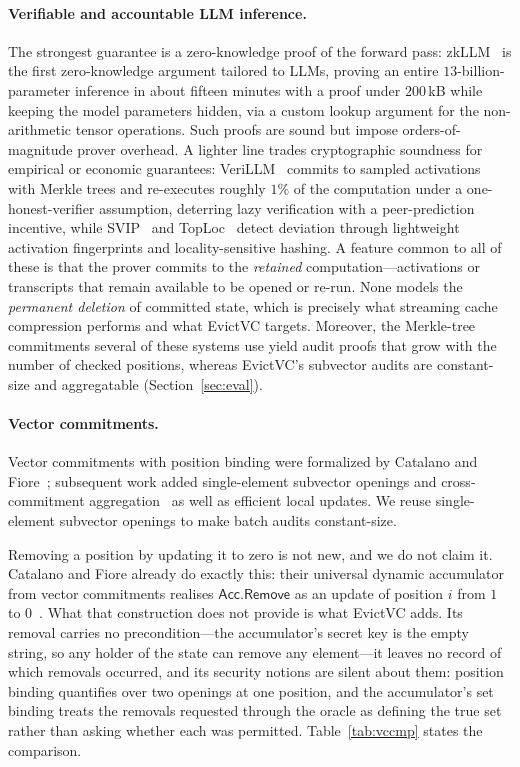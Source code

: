 \documentclass[version=preprint]{iacrcc}
\theoremstyle{definition}
\begin{document}
\paragraph{Verifiable and accountable LLM inference.}
The strongest guarantee is a zero-knowledge proof of the forward pass:
zkLLM~\cite{zkllm} is the first zero-knowledge argument tailored to LLMs, proving
an entire $13$-billion-parameter inference in about fifteen minutes with a proof
under $200$\,kB while keeping the model parameters hidden, via a custom lookup
argument for the non-arithmetic tensor operations. Such proofs are sound but
impose orders-of-magnitude prover overhead. A lighter line trades cryptographic
soundness for empirical or economic guarantees: VeriLLM~\cite{verillm} commits to
sampled activations with Merkle trees and re-executes roughly $1\%$ of the
computation under a one-honest-verifier assumption, deterring lazy verification
with a peer-prediction incentive, while SVIP~\cite{svip} and
TopLoc~\cite{toploc} detect deviation through lightweight activation fingerprints
and locality-sensitive hashing. A feature common to all of these is that the
prover commits to the \emph{retained} computation---activations or transcripts
that remain available to be opened or re-run. None models the \emph{permanent
deletion} of committed state, which is precisely what streaming cache compression
performs and what EvictVC targets. Moreover, the Merkle-tree commitments several
of these systems use yield audit proofs that grow with the number of checked
positions, whereas EvictVC's subvector audits are constant-size and aggregatable
(Section~\ref{sec:eval}).

\paragraph{Vector commitments.}
Vector commitments with position binding were formalized by Catalano and
Fiore~\cite{PKC:CatFio13}; subsequent work added single-element subvector openings and
cross-commitment aggregation~\cite{SCN:TABDFK20} as well as efficient local updates.
We reuse single-element subvector openings to make batch audits constant-size.

Removing a position by updating it to zero is not new, and we do not claim it.
Catalano and Fiore already do exactly this: their universal dynamic accumulator
from vector commitments realises $\mathsf{Acc.Remove}$ as an update of position
$i$ from $1$ to $0$~\cite[\S6.1]{PKC:CatFio13}. What that construction does not
provide is what EvictVC adds. Its removal carries no precondition---the
accumulator's secret key is the empty string, so any holder of the state can
remove any element---it leaves no record of which removals occurred, and its
security notions are silent about them: position binding quantifies over two
openings at one position, and the accumulator's set binding treats the removals
requested through the oracle as defining the true set rather than asking whether
each was permitted. Table~\ref{tab:vccmp} states the comparison.
\end{document}
